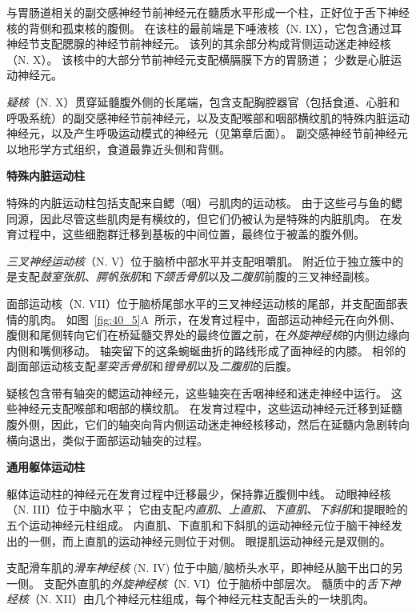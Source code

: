 与胃肠道相关的副交感神经节前神经元在髓质水平形成一个柱，正好位于舌下神经核的背侧和孤束核的腹侧。
在该柱的最前端是下唾液核（N. IX），它包含通过耳神经节支配腮腺的神经节前神经元。
该列的其余部分构成背侧运动迷走神经核（N. X）。
该核中的大部分节前神经元支配横膈膜下方的胃肠道；
少数是心脏运动神经元。


\textit{疑核}（N. X）贯穿延髓腹外侧的长尾端，包含支配胸腔器官（包括食道、心脏和呼吸系统）的副交感神经节前神经元，以及支配喉部和咽部横纹肌的特殊内脏运动神经元，以及产生呼吸运动模式的神经元（见第章后面）。
副交感神经节前神经元以地形学方式组织，食道最靠近头侧和背侧。


\textbf{特殊内脏运动柱}

特殊的内脏运动柱包括支配来自鳃（咽）弓肌肉的运动核。
由于这些弓与鱼的鳃同源，因此尽管这些肌肉是有横纹的，但它们仍被认为是特殊的内脏肌肉。
在发育过程中，这些细胞群迁移到基板的中间位置，最终位于被盖的腹外侧。


\textit{三叉神经运动核}（N. V）位于脑桥中部水平并支配咀嚼肌。
附近位于独立簇中的是支配\textit{鼓室张肌}、\textit{腭帆张肌}和\textit{下颌舌骨肌}以及\textit{二腹肌}前腹的三叉神经副核。


面部运动核（N. VII）位于脑桥尾部水平的三叉神经运动核的尾部，并支配面部表情的肌肉。
如图~\ref{fig:40_5}A~所示，在发育过程中，面部运动神经元在向外侧、腹侧和尾侧转向它们在桥延髓交界处的最终位置之前，在\textit{外旋神经核}的内侧边缘向内侧和嘴侧移动。
轴突留下的这条蜿蜒曲折的路线形成了面神经的内膝。
相邻的副面部运动核支配\textit{茎突舌骨肌}和\textit{镫骨肌}以及\textit{二腹肌}的后腹。


疑核包含带有轴突的鳃运动神经元，这些轴突在舌咽神经和迷走神经中运行。
这些神经元支配喉部和咽部的横纹肌。
在发育过程中，这些运动神经元迁移到延髓腹外侧，因此，它们的轴突向背内侧运动迷走神经核移动，然后在延髓内急剧转向横向退出，类似于面部运动轴突的过程。


\textbf{通用躯体运动柱}

躯体运动柱的神经元在发育过程中迁移最少，保持靠近腹侧中线。
动眼神经核（N. III）位于中脑水平；
它由支配\textit{内直肌}、\textit{上直肌}、\textit{下直肌}、\textit{下斜肌}和提眼睑的五个运动神经元柱组成。
内直肌、下直肌和下斜肌的运动神经元位于脑干神经发出的一侧，而上直肌的运动神经元则位于对侧。
眼提肌运动神经元是双侧的。


支配滑车肌的\textit{滑车神经核} (N. IV) 位于中脑/脑桥头水平，即神经从脑干出口的另一侧。
支配外直肌的\textit{外旋神经核}（N. VI）位于脑桥中部层次。
髓质中的\textit{舌下神经核}（N. XII）由几个神经元柱组成，每个神经元柱支配舌头的一块肌肉。




